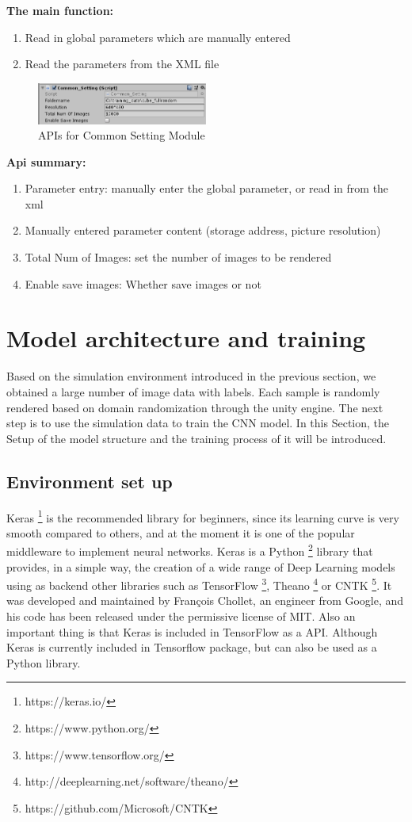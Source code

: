 \textbf{The main function:}
\begin{enumerate}
	\item Read in global parameters which are manually entered
	\item Read the parameters from the XML file
\end{enumerate}

\begin{figure}[h]
	\includegraphics[width=0.5\textwidth]{Figures/Section4_CommonApi.png} 
	\centering
	\captionsetup{justification=centering}
	\caption{APIs for Common Setting Module}
	\label{fig:commonapi}
\end{figure}

\textbf{Api summary:}
\begin{enumerate}
	\item Parameter entry: manually enter the global parameter, or read in from the xml 
	\item Manually entered parameter content (storage address, picture resolution)
	\item Total Num of Images: set the number of  images to be rendered
	\item Enable save images: Whether save images or not 
\end{enumerate}


\section{Model architecture and training}
Based on the simulation environment introduced in the previous section, we obtained a large number of image data with labels. Each sample is randomly rendered based on domain randomization through the unity engine. The next step is to use the simulation data to train the CNN model. In this Section, the Setup of the model structure and the training process of it will be introduced. 

\subsection{Environment set up}
Keras \footnote{https://keras.io/} is the recommended library for beginners, since its learning curve is very smooth compared to others, and at the moment it is one of the popular middleware to implement neural networks. Keras is a Python \footnote{https://www.python.org/} library that provides, in a simple way, the creation of a wide range of Deep Learning models using as backend other libraries such as TensorFlow \footnote{https://www.tensorflow.org/}, Theano \footnote{http://deeplearning.net/software/theano/} or CNTK \footnote{https://github.com/Microsoft/CNTK}. It was developed and maintained by François Chollet, an engineer from Google, and his code has been released under the permissive license of MIT. Also an important thing is that Keras is included in TensorFlow as a API. Although Keras is currently included in Tensorflow package, but can also be used as a Python library. 

